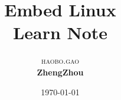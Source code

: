 \documentclass[a4paper,12pt,oneside]{book}
\begin{document}
\title{\textbf{Embed Linux }\\ %
 Learn Note}  %

\author{\textsc{haobo.gao} %
\\{\textbf{ZhengZhou}}} %

\date{\today} %
\maketitle

\tableofcontents
{}




\end{document}
